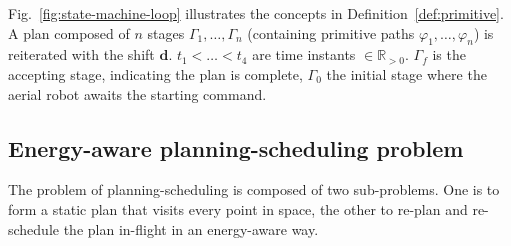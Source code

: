 \documentclass[letterpaper,10pt,journal,twoside]{IEEEtran}
\theoremstyle{definition}
\begin{document}

Fig.~\ref{fig:state-machine-loop} illustrates  the concepts in Definition~\ref{def:primitive}. A plan composed of $n$ stages $\Gamma_1,\dots,\Gamma_n$ (containing primitive paths $\varphi_1,\dots,\varphi_n$) is reiterated with the shift $\mathbf{d}$. $t_1<\dots<t_4$ are time instants $\in\mathbb{R}_{> 0}$. $\Gamma_f$ is the accepting stage, indicating the plan is complete, $\Gamma_0$ the initial stage where the aerial robot awaits the starting command.

\subsection{Energy-aware planning-scheduling problem}
\label{sec:pbfor}

The problem of planning-scheduling is composed of two sub-problems. One is to form a static plan that visits every point in space, the other to re-plan and re-schedule the plan in-flight in an energy-aware way.
\end{document}

